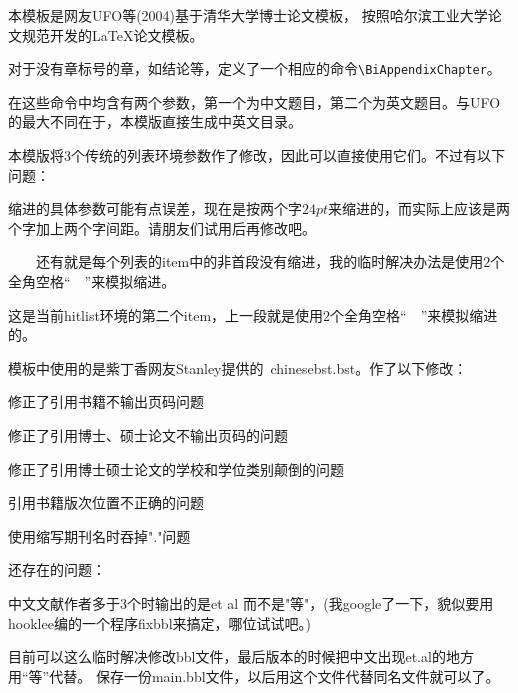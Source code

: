 本模板是网友UFO等(2004)基于清华大学博士论文模板，
按照哈尔滨工业大学论文规范开发的\LaTeX{}论文模板。

\label{Update:06.06.05}

对于没有章标号的章，如结论等，定义了一个相应的命令\verb"\BiAppendixChapter"。

在这些命令中均含有两个参数，第一个为中文题目，第二个为英文题目。与UFO的最大不同在于，本模版直接生成中英文目录。

本模版将3个传统的列表环境参数作了修改，因此可以直接使用它们。不过有以下问题：
\begin{hitlist}
\item 缩进的具体参数可能有点误差，现在是按两个字$24pt$来缩进的，而实际上应该是两个字加上两个字间距。请朋友们试用后再修改吧。

　　还有就是每个列表的item中的非首段没有缩进，我的临时解决办法是使用$2$个全角空格``　''来模拟缩进。

\item 这是当前hitlist环境的第二个item，上一段就是使用$2$个全角空格``　''来模拟缩进的。
\end{hitlist}

模板中使用的是紫丁香网友Stanley提供的~chinesebst.bst。作了以下修改：
\begin{hitlist}
\item 修正了引用书籍不输出页码问题
\item 修正了引用博士、硕士论文不输出页码的问题
\item 修正了引用博士硕士论文的学校和学位类别颠倒的问题
\item 引用书籍版次位置不正确的问题
\item 使用缩写期刊名时吞掉"."问题
\end{hitlist}
还存在的问题：
\begin{hitlist}
\item 中文文献作者多于3个时输出的是et al 而不是"等"，(我google了一下，貌似要用hooklee编的一个程序fixbbl来搞定，哪位试试吧。)
\end{hitlist}

目前可以这么临时解决修改bbl文件，最后版本的时候把中文出现et.al的地方用``等''代替。
保存一份main.bbl文件，以后用这个文件代替同名文件就可以了。

